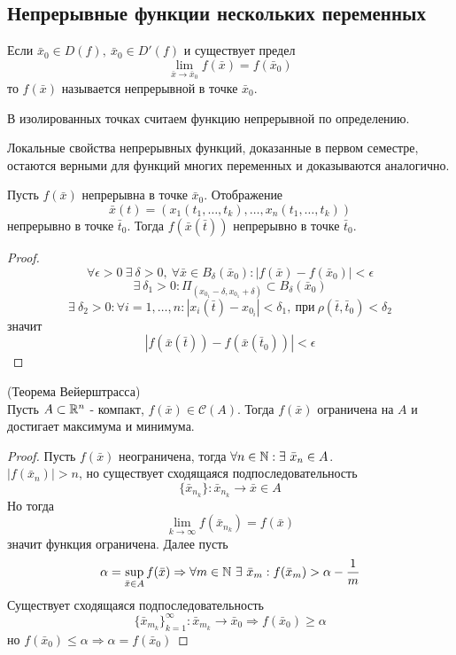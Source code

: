 \subsection{Непрерывные функции нескольких переменных}
\begin{definition}
    Если $\bar{x}_0\in D(f),\ \bar{x}_0\in D'(f)$ и существует предел 
    \[\lim\limits_{\bar{x}\to \bar{x}_0}f(\bar{x})=f(\bar{x}_0)\]
    то $f(\bar{x})$ называется непрерывной в точке $\bar{x}_0$.
\end{definition} 
\begin{comm}
    В изолированных точках считаем функцию непрерывной по определению.
\end{comm} 
\begin{comm}
    Локальные свойства непрерывных функций, доказанные в первом семестре, остаются
    верными для функций многих переменных и доказываются аналогично.
\end{comm} 
\begin{theorem}
    Пусть $f(\bar{x})$ непрерывна в точке $\bar{x}_0$. Отображение
    \[\bar{x}(t)=(x_1(t_1,\dots,t_k), \dots , x_n(t_1, \dots, t_k))\]
    непрерывно в точке $\bar{t}_0$. Тогда $f(\bar{x}(\bar{t}))$ непрерывно в точке $\bar{t}_0$.
\end{theorem} 
\begin{proof}
    \[\forall \epsilon>0\ \exists\ \delta>0,\ \forall \bar{x}\in B_{\delta}(\bar{x}_0): |f(\bar{x})-f(\bar{x}_0)|<\epsilon\]
    \[\exists\ \delta_1>0: \Pi_{(x_{0_1}-\delta, x_{0_1}+\delta)}\subset B_{\delta}(\bar{x}_0)\]
    \[\exists\ \delta_2>0: \forall i=1,\dots, n: |x_i(\bar{t})-x_{0_i}|<\delta_1,\ \text{при}\ \rho(\bar{t}, \bar{t}_0)<\delta_2\]
    значит
    \[|f(\bar{x}(\bar{t}))-f(\bar{x}(\bar{t}_0))|<\epsilon\]
\end{proof}
\begin{theorem} (Теорема Вейерштрасса)\\
    Пусть $A\subset \mathbb{R}^n$ - компакт, $f(\bar{x})\in \mathcal{C}(A)$. Тогда $f(\bar{x})$ ограничена на $A$ и достигает максимума и минимума.
\end{theorem} 
\begin{proof}
    Пусть $f(\bar{x})$ неограничена, тогда $\forall n\in \N: \exists\ \bar{x}_n\in A$.\\
    $|f(\bar{x}_n)|>n$, но существует сходящаяся подпоследовательность
    \[\{\bar{x}_{n_k}\}: \bar{x}_{n_k}\to \bar{x}\in A\] 
    Но тогда
    \[\lim\limits_{k\to \infty}f(\bar{x}_{n_k})=f(\bar{x})\]
    значит функция ограничена.
    Далее пусть \[\alpha=\sup\limits_{\bar{x}\in A}f(\bar{x}) \Rightarrow \forall m\in \mathbb{N}\ \exists\ \bar{x}_m: f(\bar{x}_m)>\alpha-\frac{1}{m}\] 
    Существует сходящаяся подпоследовательность
    \[\{\bar{x}_{m_k}\}_{k=1}^{\infty}: \bar{x}_{m_k}\to \bar{x}_0 \Rightarrow f(\bar{x}_0)\geq \alpha\] но $f(\bar{x}_0)\leq \alpha \Rightarrow \alpha= f(\bar{x}_0)$ 
\end{proof} 
